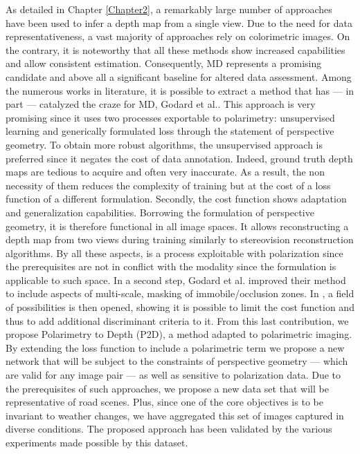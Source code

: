 As detailed in Chapter \ref{Chapter2}, a remarkably large number of approaches have been used to infer a depth map from a single view. Due to the need for data representativeness, a vast majority of approaches rely on colorimetric images. On the contrary, it is noteworthy that all these methods show increased capabilities and allow consistent estimation. Consequently, MD represents a promising candidate and above all a significant baseline for altered data assessment. Among the numerous works in literature, it is possible to extract a method that has — in part — catalyzed the craze for MD, Godard et al.\cite{godard2017unsupervised}. 
This approach is very promising since it uses two processes exportable to polarimetry: unsupervised learning and generically formulated loss through the statement of perspective geometry. To obtain more robust algorithms, the unsupervised approach is preferred since it negates the cost of data annotation. Indeed, ground truth depth maps are tedious to acquire and often very inaccurate. As a result, the non necessity of them reduces the complexity of training but at the cost of a loss function of a different formulation. 
Secondly, the cost function shows adaptation and generalization capabilities. Borrowing the formulation of perspective geometry, it is therefore functional in all image spaces. It allows reconstructing a depth map from two views during training similarly to stereovision reconstruction algorithms.
By all these aspects, \cite{godard2017unsupervised} is a process exploitable with polarization since the prerequisites are not in conflict with the modality since the formulation is applicable to such space. 
In a second step, Godard et al. improved their method to include aspects of multi-scale, masking of immobile/occlusion zones. In \cite{godard2019digging}, a field of possibilities is then opened, showing it is possible to limit the cost function and thus to add additional discriminant criteria to it.
From this last contribution, we propose Polarimetry to Depth (P2D), a method adapted to polarimetric imaging. By extending the loss function to include a polarimetric term we propose a new network that will be subject to the constraints of perspective geometry — which are valid for any image pair — as well as sensitive to polarization data. Due to the prerequisites of such approaches, we propose a new data set that will be representative of road scenes. Plus, since one of the core objectives is to be invariant to weather changes, we have aggregated this set of images captured in diverse conditions. The proposed approach has been validated by the various experiments made possible by this dataset.
